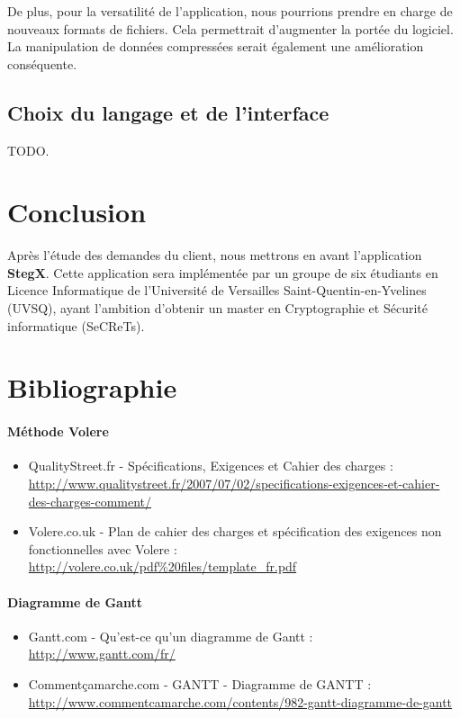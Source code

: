 \documentclass[11pt]{article}
\begin{document}
De plus, pour la versatilité de l'application, nous pourrions prendre en charge
de nouveaux formats de fichiers. Cela permettrait d'augmenter la portée du
logiciel. La manipulation de données compressées serait également une
amélioration conséquente. 

\subsection{Choix du langage et de l'interface}

TODO.

\section{Conclusion}

Après l'étude des demandes du client, nous mettrons en avant l'application
\textbf{StegX}. Cette application sera implémentée par un groupe de six
étudiants en Licence Informatique de l'Université de Versailles
Saint-Quentin-en-Yvelines (UVSQ), ayant l'ambition d'obtenir un master en
Cryptographie et Sécurité informatique (SeCReTs). 

\newpage

\section{Bibliographie}

\paragraph{Méthode Volere}
\begin{itemize}
\item QualityStreet.fr - Spécifications, Exigences et Cahier des charges : \\
    \url{http://www.qualitystreet.fr/2007/07/02/specifications-exigences-et-cahier-des-charges-comment/}
\item Volere.co.uk - Plan de cahier des charges et spécification des exigences
    non fonctionnelles avec Volere : \\
    \url{http://volere.co.uk/pdf%20files/template_fr.pdf}
\end{itemize}

\paragraph{Diagramme de Gantt}
\begin{itemize}
\item Gantt.com - Qu'est-ce qu'un diagramme de Gantt : \\
    \url{http://www.gantt.com/fr/}
\item Commentçamarche.com - GANTT - Diagramme de GANTT : \\
    \url{http://www.commentcamarche.com/contents/982-gantt-diagramme-de-gantt}
\end{itemize}
\end{document}
